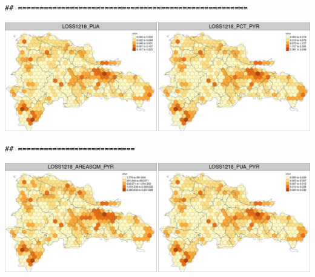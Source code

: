 \documentclass[10pt,landscape,a3paper]{article}
\begin{document}
\begin{verbatim}
## =====================================================
\end{verbatim}

\begin{center}\includegraphics{img/data-download-preparation-eda/zonal-long-term-grid-11} \end{center}

\begin{verbatim}
## ===========================
\end{verbatim}

\begin{center}\includegraphics{img/data-download-preparation-eda/zonal-long-term-grid-12} \end{center}
\end{document}
